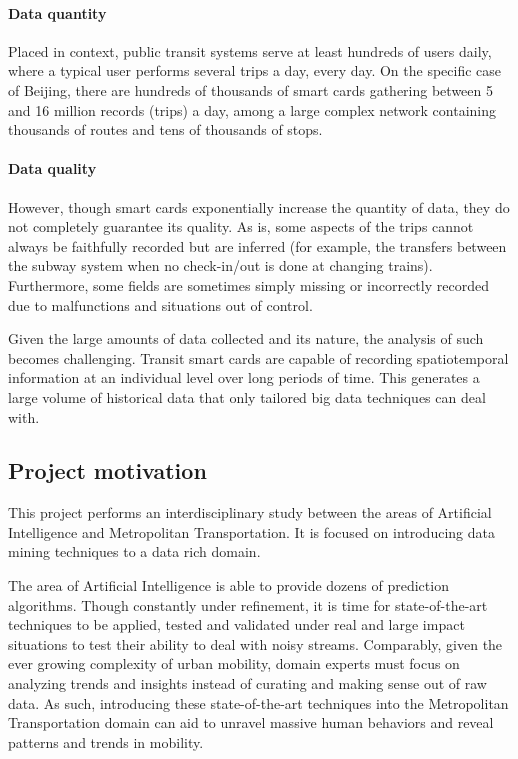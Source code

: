 \documentclass{article}
\begin{document}
\paragraph{Data quantity}

Placed in context, public transit systems serve at least hundreds of users daily, where a typical user performs several trips a day, every day. On the specific case of Beijing, there are hundreds of thousands of smart cards gathering between 5 and 16 million records (trips) a day, among a large complex network containing thousands of routes and tens of thousands of stops. 

\paragraph{Data quality}

However, though smart cards exponentially increase the quantity of data, they do not completely guarantee its quality. As is, some aspects of the trips cannot always be faithfully recorded but are inferred (for example, the transfers between the subway system when no check-in/out is done at changing trains). Furthermore, some fields are sometimes simply missing or incorrectly recorded due to malfunctions and situations out of control. 


Given the large amounts of data collected and its nature, the analysis of such becomes challenging. Transit smart cards are capable of recording spatiotemporal information at an individual level over long periods of time. This generates a large volume of historical data that only tailored big data techniques can deal with. 

\subsection{Project motivation}
This project performs an interdisciplinary study between the areas of Artificial Intelligence and Metropolitan Transportation. It is focused on introducing data mining techniques to a data rich domain. 

The area of Artificial Intelligence is able to provide dozens of prediction algorithms. Though constantly under refinement, it is time for state-of-the-art techniques to be applied, tested and validated under real and large impact situations to test their ability to deal with noisy streams. Comparably, given the ever growing complexity of urban mobility, domain experts must focus on analyzing trends and insights instead of curating and making sense out of raw data. As such, introducing these state-of-the-art techniques into the Metropolitan Transportation domain can aid to unravel massive human behaviors and reveal patterns and trends in mobility.
\end{document}
